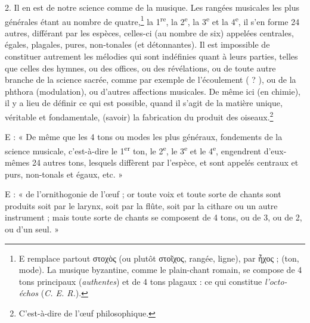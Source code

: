 \documentclass[a4paper, 11pt, oneside, polutonikogreek, french]{article}
\begin{document}
2. Il en est de notre science comme de la musique. Les rangées musicales les plus générales étant au nombre de quatre,\footnote{E remplace partout στοχὸς (ou plutôt στοῖχος, rangée, ligne), par ἦχος ; (ton, mode). La musique byzantine, comme le plain-chant romain, se compose de 4 tons principaux (\emph{authentes}) et de 4 tons plagaux : ce qui constitue \emph{l'octo-échos} (\emph{C. E. R.}).  } la 1\textsuperscript{re}, la 2\textsuperscript{e}, la 3\textsuperscript{e} et la 4\textsuperscript{e}, il s'en forme 24 autres, différant par les espèces, celles-ci (au nombre de six) appelées centrales, égales, plagales, pures, non-tonales (et détonnantes). Il est impossible de constituer autrement les mélodies qui sont indéfinies quant à leurs parties, telles que celles des hymnes, ou des offices, ou des révélations, ou de toute autre branche de la science sacrée, comme par exemple de l'écoulement ( ? ), ou de la phthora (modulation), ou d'autres affections musicales. De même ici (en chimie), il y a lieu de définir ce qui est possible, quand il s'agit de la matière unique, véritable et fondamentale, (savoir) la fabrication du produit des oiseaux.\footnote{C'est-à-dire de l'œuf philosophique.  }

E : « De même que les 4 tons ou modes les plus généraux, fondements de la science musicale, c'est-à-dire le 1\textsuperscript{er} ton, le 2\textsuperscript{e}, le 3\textsuperscript{e} et le 4\textsuperscript{e}, engendrent d'eux-mêmes 24 autres tons, lesquels diffèrent par l'espèce, et sont appelés centraux et purs, non-tonals et égaux, etc. »

E : « de l'ornithogonie de l'œuf ; or toute voix et toute sorte de chants sont produits soit par le larynx, soit par la flûte, soit par la cithare ou un autre instrument ; mais toute sorte de chants se composent de 4 tons, ou de 3, ou de 2, ou d'un seul. »
\end{document}
